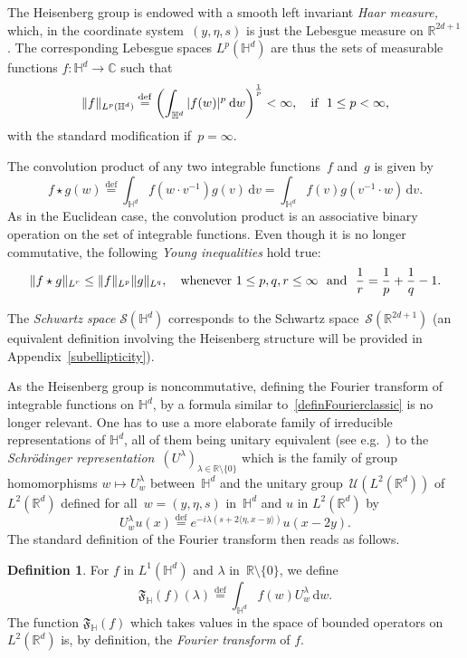 \documentclass[11pt]{article}
\theoremstyle{definition}
\newtheorem{defi}[theo]{Definition}
\numberwithin{equation}{section}
\numberwithin{figure}{section}
\numberwithin{table}{section}
\newcommand{\lam}{\lambda}
\newcommand*\cS{\mathcal{S}}
\newcommand*\cU{\mathcal{U}}
\newcommand*\fF{\mathfrak{F}}
\newcommand*\bbC{\mathbb{C}}
\newcommand*\R{\mathbb{R}}
\newcommand*\bbH{\mathbb{H}}
\newcommand\norm[2]{\|#1\|_{#2}}
\newcommand*\eqdefa{\overset{\mathrm{def}}{=}}
\newcommand*{\dd}{\mathrm{d}}
\newcommand{\dv}{\dd v}
\newcommand{\dw}{\dd w}
\begin{document}
The Heisenberg group is endowed with a smooth left invariant \emph{Haar measure,} which, in the coordinate system~$(y, \eta, s)$ is just the Lebesgue measure on $\R^{2d+1}$. The corresponding Lebesgue spaces $L^p (\bbH^d)$ are thus the sets of measurable functions $f:\bbH^d\to\bbC$ such that
\[
\|f\|_{L^p (\bbH^d)} \eqdefa \left(\int_{\bbH^d} |f(w)|^p \: \dw \right)^\frac1p<\infty, \quad\hbox{if }\ 1\leq p<\infty,
\]
with the standard modification if~$p=\infty$.

The convolution product of any two integrable functions~$f$ and~$g$ is given by
\[
f \star g (w) \eqdefa \int_{\bbH^d} f (w \cdot v^{-1}) g(v)\, \dv = \int_{\bbH^d} f (v) g(v^{-1} \cdot w)\, \dv.
\]
As in the Euclidean case, the convolution product is an associative binary operation on the set of integrable functions. Even though it is no longer commutative, the following \emph{Young inequalities} hold true:
\[
\norm{ f \star g }{L^r} \leq \norm f {L^p} \norm g {L^q},
\quad \hbox{whenever}\ 1\leq p,q,r\leq\infty\ \hbox{ and }\
\frac{1}{r} = \frac{1}{p} + \frac{1}{q} - 1.
\]

The \emph{Schwartz space} $\cS(\bbH^d)$ corresponds to the Schwartz space~$\cS(\R^{2d+1})$ (an equivalent definition involving the Heisenberg structure will be provided in Appendix~\ref{subellipticity}).

As the Heisenberg group is noncommutative, defining the Fourier transform of integrable functions on $\bbH^d$, by a formula similar to~\eqref{definFourierclassic} is no longer relevant. One has to use a more elaborate family of irreducible representations of $\bbH^d$, all of them being unitary equivalent (see e.g.~\cite[Chapter~2]{taylor1}) to the \emph{Schr\"odinger representation}~$(U^\lam)_{\lambda\in\R\setminus\{0\}}$ which is the family of group homomorphisms $w\mapsto U^\lam_w$ between~$\bbH^d$ and the unitary group~$\cU(L^2(\R^d))$ of~$L^2(\R^d)$ defined for all~$w=(y,\eta, s)$ in~$\bbH^d$ and $u$ in $L^2(\R^d)$ by
\[
U^\lam _w u(x)\eqdefa e^{-i\lam (s+2\langle \eta, x-y\rangle)} u(x-2y).
\]
The standard definition of the Fourier transform then reads as follows.

\begin{defi}\label{definFourierSchrodinger}
For $f$ in $L^1(\bbH^d)$ and $\lam$ in~$ \R\setminus\{0\}$, we define
\[
\fF_{\bbH} (f)(\lam) \eqdefa \int_{\bbH^d} f(w) U^\lam_w\, \dw.
\]
The function $\fF_{\bbH} (f)$ which takes values in the space of bounded operators on $L^2(\R^d)$ is, by definition, the \emph{ Fourier transform}  of $f$.
\end{defi}
\end{document}
